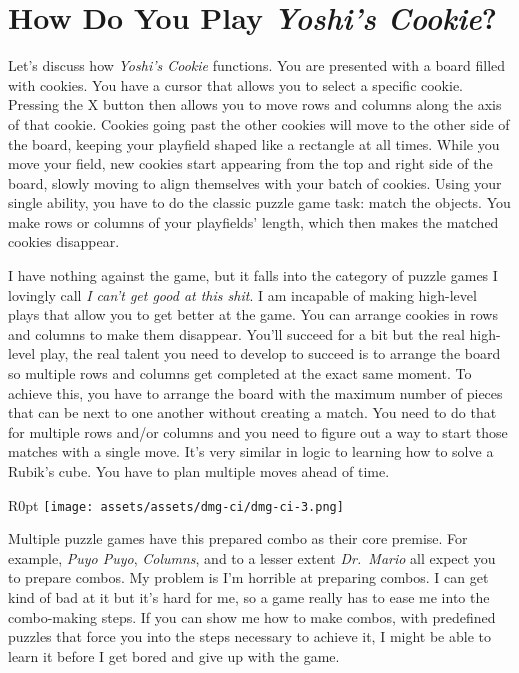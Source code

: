 \documentclass{book}
\begin{document}
\FloatBarrier\needspace{10mm}\section*{How Do You Play \emph{Yoshi’s Cookie}?}\nopagebreak[4]

Let’s discuss how \emph{Yoshi’s Cookie} functions. You are presented with a board filled with cookies. You have a cursor that allows you to select a specific cookie. Pressing the X button then allows you to move rows and columns along the axis of that cookie. Cookies going past the other cookies will move to the other side of the board, keeping your playfield shaped like a rectangle at all times. While you move your field, new cookies start appearing from the top and right side of the board, slowly moving to align themselves with your batch of cookies. Using your single ability, you have to do the classic puzzle game task: match the objects. You make rows or columns of your playfields’ length, which then makes the matched cookies disappear.

I have nothing against the game, but it falls into the category of puzzle games I lovingly call \emph{I can’t get good at this shit}. I am incapable of making high-level plays that allow you to get better at the game. You can arrange cookies in rows and columns to make them disappear. You’ll succeed for a bit but the real high-level play, the real talent you need to develop to succeed is to arrange the board so multiple rows and columns get completed at the exact same moment. To achieve this, you have to arrange the board with the maximum number of pieces that can be next to one another without creating a match. You need to do that for multiple rows and/or columns and you need to figure out a way to start those matches with a single move. It’s very similar in logic to learning how to solve a Rubik’s cube. You have to plan multiple moves ahead of time.

\begin{wrapfigure}{R}{0pt} \texttt{[image: assets/assets/dmg-ci/dmg-ci-3.png]}\end{wrapfigure}
Multiple puzzle games have this prepared combo as their core premise. For example, \emph{Puyo Puyo}, \emph{Columns}, and to a lesser extent \emph{Dr.~Mario} all expect you to prepare combos. My problem is I’m horrible at preparing combos. I can get kind of bad at it but it’s hard for me, so a game really has to ease me into the combo-making steps. If you can show me how to make combos, with predefined puzzles that force you into the steps necessary to achieve it, I might be able to learn it before I get bored and give up with the game.
\end{document}
